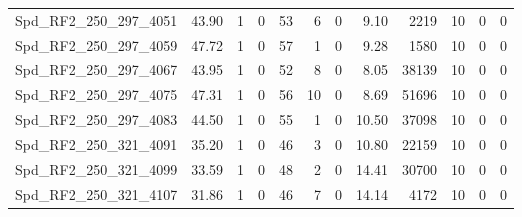 \begin{longtable}[c]{@{}lrrrrrrrrrrr@{}}
Spd\_RF2\_250\_297\_4051     & 43.90                  & 1                       & 0                       & 53                     & 6                       & 0                       & 9.10                    & 2219                     & 10                       & 0                        & 0                        \\
Spd\_RF2\_250\_297\_4059     & 47.72                  & 1                       & 0                       & 57                     & 1                       & 0                       & 9.28                    & 1580                     & 10                       & 0                        & 0                        \\
Spd\_RF2\_250\_297\_4067     & 43.95                  & 1                       & 0                       & 52                     & 8                       & 0                       & 8.05                    & 38139                    & 10                       & 0                        & 0                        \\
Spd\_RF2\_250\_297\_4075     & 47.31                  & 1                       & 0                       & 56                     & 10                      & 0                       & 8.69                    & 51696                    & 10                       & 0                        & 0                        \\
Spd\_RF2\_250\_297\_4083     & 44.50                  & 1                       & 0                       & 55                     & 1                       & 0                       & 10.50                   & 37098                    & 10                       & 0                        & 0                        \\
Spd\_RF2\_250\_321\_4091     & 35.20                  & 1                       & 0                       & 46                     & 3                       & 0                       & 10.80                   & 22159                    & 10                       & 0                        & 0                        \\
Spd\_RF2\_250\_321\_4099     & 33.59                  & 1                       & 0                       & 48                     & 2                       & 0                       & 14.41                   & 30700                    & 10                       & 0                        & 0                        \\
Spd\_RF2\_250\_321\_4107     & 31.86                  & 1                       & 0                       & 46                     & 7                       & 0                       & 14.14                   & 4172                     & 10                       & 0                        & 0                        \\

\end{longtable}
